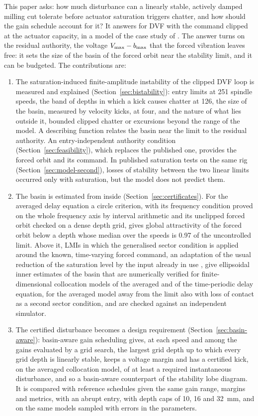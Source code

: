 This paper asks: how much disturbance can a linearly stable, actively damped milling cut tolerate before actuator saturation triggers chatter, and how should the gain schedule account for it? It answers for DVF with the command clipped at the actuator capacity, in a model of the case study of \citet{ozsoy2026robust}. The answer turns on the residual authority, the voltage $V_{\max}-b_{\max}$ that the forced vibration leaves free: it sets the size of the basin of the forced orbit near the stability limit, and it can be budgeted. The contributions are:
\begin{enumerate}
\item The saturation-induced finite-amplitude instability of the clipped DVF loop is measured and explained (Section~\ref{sec:bistability}): entry limits at 251 spindle speeds, the band of depths in which a kick causes chatter at 126, the size of the basin, measured by velocity kicks, at four, and the nature of what lies outside it, bounded clipped chatter or excursions beyond the range of the model. A describing function relates the basin near the limit to the residual authority. An entry-independent authority condition (Section~\ref{sec:feasibility}), which replaces the published one, provides the forced orbit and its command. In published saturation tests on the same rig (Section~\ref{sec:model-second}), losses of stability between the two linear limits occurred only with saturation, but the model does not predict them.
\item The basin is estimated from inside (Section~\ref{sec:certificates}). For the averaged delay equation a circle criterion, with its frequency condition proved on the whole frequency axis by interval arithmetic and its unclipped forced orbit checked on a dense depth grid, gives global attractivity of the forced orbit below a depth whose median over the speeds is 0.97 of the uncontrolled limit. Above it, LMIs in which the generalised sector condition is applied around the known, time-varying forced command, an adaptation of the usual reduction of the saturation level by the input already in use \citep{hu2001book,tarbouriech2011book}, give ellipsoidal inner estimates of the basin that are numerically verified for finite-dimensional collocation models of the averaged and of the time-periodic delay equation, for the averaged model away from the limit also with loss of contact as a second sector condition, and are checked against an independent simulator.
\item The certified disturbance becomes a design requirement (Section~\ref{sec:basin-aware}): basin-aware gain scheduling gives, at each speed and among the gains evaluated by a grid search, the largest grid depth up to which every grid depth is linearly stable, keeps a voltage margin and has a certified kick, on the averaged collocation model, of at least a required instantaneous disturbance, and so a basin-aware counterpart of the stability lobe diagram. It is compared with reference schedules given the same gain range, margins and metrics, with an abrupt entry, with depth caps of 10, 16 and \SI{32}{\milli\metre}, and on the same models sampled with errors in the parameters.

\end{enumerate}
